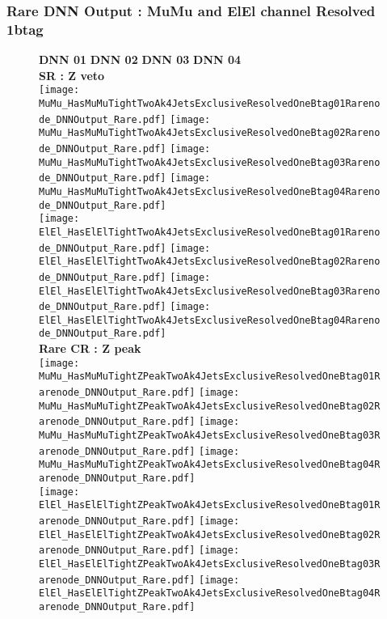 \documentclass[9pt]{beamer}
\begin{document}
\begin{frame}
	\frametitle{Rare DNN Output : MuMu and ElEl channel Resolved 1btag}
	\begin{figure}
	    \textbf{DNN 01} \hspace{1.2cm} \textbf{DNN 02} \hspace{1.2cm} \textbf{DNN 03} \hspace{1.2cm} \textbf{DNN 04} \\
        \centering
        \textbf{SR : Z veto} \\
		\texttt{[image: MuMu\_HasMuMuTightTwoAk4JetsExclusiveResolvedOneBtag01Rarenode\_DNNOutput\_Rare.pdf]}
		\texttt{[image: MuMu\_HasMuMuTightTwoAk4JetsExclusiveResolvedOneBtag02Rarenode\_DNNOutput\_Rare.pdf]}
		\texttt{[image: MuMu\_HasMuMuTightTwoAk4JetsExclusiveResolvedOneBtag03Rarenode\_DNNOutput\_Rare.pdf]}
		\texttt{[image: MuMu\_HasMuMuTightTwoAk4JetsExclusiveResolvedOneBtag04Rarenode\_DNNOutput\_Rare.pdf]}\\
		\texttt{[image: ElEl\_HasElElTightTwoAk4JetsExclusiveResolvedOneBtag01Rarenode\_DNNOutput\_Rare.pdf]}
		\texttt{[image: ElEl\_HasElElTightTwoAk4JetsExclusiveResolvedOneBtag02Rarenode\_DNNOutput\_Rare.pdf]}
		\texttt{[image: ElEl\_HasElElTightTwoAk4JetsExclusiveResolvedOneBtag03Rarenode\_DNNOutput\_Rare.pdf]}
		\texttt{[image: ElEl\_HasElElTightTwoAk4JetsExclusiveResolvedOneBtag04Rarenode\_DNNOutput\_Rare.pdf]}\\
        \textbf{Rare CR : Z peak} \\
		\texttt{[image: MuMu\_HasMuMuTightZPeakTwoAk4JetsExclusiveResolvedOneBtag01Rarenode\_DNNOutput\_Rare.pdf]}
		\texttt{[image: MuMu\_HasMuMuTightZPeakTwoAk4JetsExclusiveResolvedOneBtag02Rarenode\_DNNOutput\_Rare.pdf]}
		\texttt{[image: MuMu\_HasMuMuTightZPeakTwoAk4JetsExclusiveResolvedOneBtag03Rarenode\_DNNOutput\_Rare.pdf]}
		\texttt{[image: MuMu\_HasMuMuTightZPeakTwoAk4JetsExclusiveResolvedOneBtag04Rarenode\_DNNOutput\_Rare.pdf]}\\
		\texttt{[image: ElEl\_HasElElTightZPeakTwoAk4JetsExclusiveResolvedOneBtag01Rarenode\_DNNOutput\_Rare.pdf]}
		\texttt{[image: ElEl\_HasElElTightZPeakTwoAk4JetsExclusiveResolvedOneBtag02Rarenode\_DNNOutput\_Rare.pdf]}
		\texttt{[image: ElEl\_HasElElTightZPeakTwoAk4JetsExclusiveResolvedOneBtag03Rarenode\_DNNOutput\_Rare.pdf]}
		\texttt{[image: ElEl\_HasElElTightZPeakTwoAk4JetsExclusiveResolvedOneBtag04Rarenode\_DNNOutput\_Rare.pdf]}\\
	\end{figure}
\end{frame}
\end{document}
